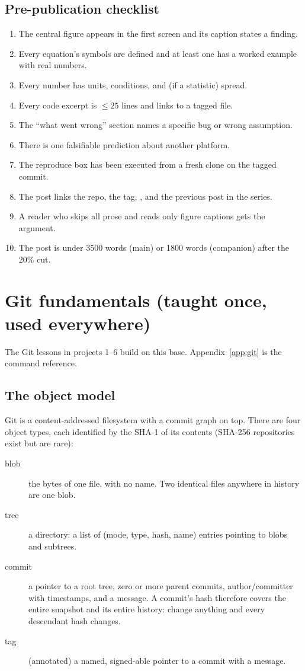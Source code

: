 \subsection{Pre-publication checklist}

\begin{enumerate}
  \item The central figure appears in the first screen and its caption states a finding.
  \item Every equation's symbols are defined and at least one has a worked example with real numbers.
  \item Every number has units, conditions, and (if a statistic) spread.
  \item Every code excerpt is $\le 25$ lines and links to a tagged file.
  \item The ``what went wrong'' section names a specific bug or wrong assumption.
  \item There is one falsifiable prediction about another platform.
  \item The reproduce box has been executed from a fresh clone on the tagged commit.
  \item The post links the repo, the tag, , and the previous post in the series.
  \item A reader who skips all prose and reads only figure captions gets the argument.
  \item The post is under 3500 words (main) or 1800 words (companion) after the 20\% cut.
\end{enumerate}

\section{Git fundamentals (taught once, used everywhere)}
\label{sec:gitfund}

The Git lessons in projects 1--6 build on this base. Appendix~\ref{app:git} is the command reference.

\subsection{The object model}

Git is a content-addressed filesystem with a commit graph on top. There are four object types, each identified by the SHA-1 of its contents (SHA-256 repositories exist but are rare):

\begin{description}
  \item[blob] the bytes of one file, with no name. Two identical files anywhere in history are one blob.
  \item[tree] a directory: a list of (mode, type, hash, name) entries pointing to blobs and subtrees.
  \item[commit] a pointer to a root tree, zero or more parent commits, author/committer with timestamps, and a message. A commit's hash therefore covers the entire snapshot and its entire history: change anything and every descendant hash changes.
  \item[tag] (annotated) a named, signed-able pointer to a commit with a message.
\end{description}

